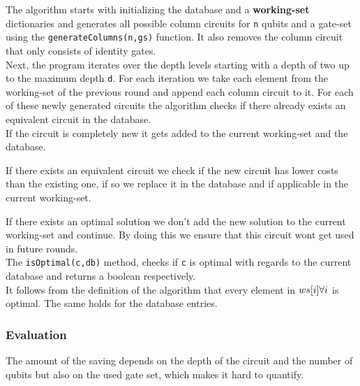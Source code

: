 The algorithm starts with initializing the database and a \textbf{working-set} dictionaries and generates all possible column circuits for \texttt{n} qubits and a gate-set using the \texttt{generateColumns(n,gs)} function. It also removes the column circuit that only consists of identity gates.\\

Next, the program iterates over the depth levels starting with a depth of two up to the maximum depth \texttt{d}. For each iteration we take each element from the working-set of the previous round and append each column circuit to it. For each of these newly generated circuits the algorithm checks if there already exists an equivalent circuit in the database. \\

If the circuit is completely new it gets added to the current working-set and the database. 

If there exists an equivalent circuit we check if the new circuit has lower costs than the existing one, if so we replace it in the database and if applicable in the current working-set. 

If there exists an optimal solution we don't add the new solution to the current working-set and continue. By doing this we ensure that this circuit wont get used in future rounds.\\

The \texttt{isOptimal(c,db)} method, checks if \texttt{c} is optimal with regards to the current database  and returns a boolean respectively.\\

It follows from the definition of the algorithm that every element in $ws[i]\space\forall i$ is optimal. The same holds for the database entries.


\subsubsection{Evaluation}
The amount of the saving depends on the depth of the circuit and the number of qubits but also on the used gate set, which makes it hard to quantify. 

